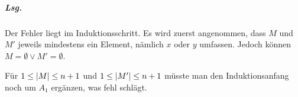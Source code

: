 \documentclass{scrreprt}
\begin{document}
\subparagraph{Lsg.} Der Fehler liegt im Induktionsschritt.
Es wird zuerst angenommen, dass $M$ und $M'$ jeweils mindestens ein Element, nämlich
$x$ oder $y$ umfassen.
Jedoch können $M = \emptyset \lor M' = \emptyset$.

Für $1 \leq \abs{M} \leq n + 1$ und $1 \leq \abs{M'} \leq n +1$ müsste man den
Induktionsanfang noch um $A_1$ ergänzen, was fehl schlägt.
\end{document}
